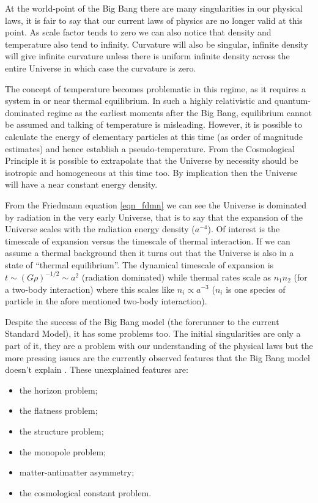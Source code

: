 At the world-point of the Big Bang there are many singularities in our physical laws, it is fair to say that our current laws of physics are no longer valid at this point. As scale factor tends to zero we can also notice that density and temperature also tend to infinity. Curvature will also be singular, infinite density will give infinite curvature unless there is uniform infinite density across the entire Universe in which case the curvature is zero.

The concept of temperature becomes problematic in this regime, as it requires a system in or near thermal equilibrium. In such a highly relativistic and quantum-dominated regime as the earliest moments after the Big Bang, equilibrium cannot be assumed and talking of temperature is misleading. However, it is possible to calculate the energy of elementary particles at this time (as order of magnitude estimates) and hence establish a pseudo-temperature. From the Cosmological Principle it is possible to extrapolate that the Universe by necessity should be isotropic and homogeneous at this time too. By implication then the Universe will have a near constant energy density.

From the Friedmann equation \ref{eqn_fdmn} we can see the Universe is dominated by radiation in the very early Universe, that is to say that the expansion of the Universe scales with the radiation energy density ($a^{-4}$). Of interest is the timescale of expansion versus the timescale of thermal interaction. If we can assume a thermal background then it turns out that the Universe is also in a state of ``thermal equilibrium''. The dynamical timescale of expansion is $ t \sim (G\rho)^{-1/2} \sim a^2$ (radiation dominated) while thermal rates scale as $n_1 n_2$ (for a two-body interaction) where this scales like $n_i \propto a^{-3}$ ($n_i$ is one species of particle in the afore mentioned two-body interaction).

Despite the success of the Big Bang model (the forerunner to the current Standard Model), it has some problems too. The initial singularities are only a part of it, they are a problem with our understanding of the physical laws but the more pressing issues are the currently observed features that the Big Bang model doesn't explain \citep{bib_pea, bib_baum}. These unexplained features are:

\begin{itemize}
\item the horizon problem;
\item the flatness problem;
\item the structure problem;
\item the monopole problem;
\item matter-antimatter asymmetry;
\item the cosmological constant problem.
\end{itemize}

